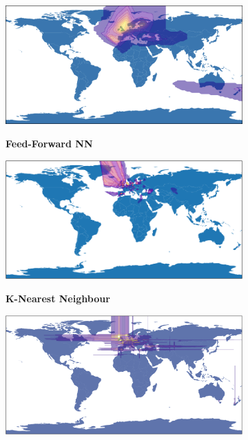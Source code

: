 \begin{figure}[hbt!]
\begin{subfigure}{.23\linewidth}
  \includegraphics[width=\linewidth]{Images/Screenshot 2023-11-15 at 15.16.04.png}
\vspace*{-3ex}  
\begin{center}
\textbf{Feed-Forward NN}
\end{center}
\end{subfigure}
\begin{subfigure}{.23\linewidth}
  \includegraphics[width=\linewidth]{Images/knn_prediction.png}
\vspace*{-3ex}  
\begin{center}
\textbf{K-Nearest Neighbour}
\end{center}
\end{subfigure}
\begin{subfigure}{.23\linewidth}
  \includegraphics[width=\linewidth]{Images/RFcorrected.png} 

\end{subfigure}
\end{figure}
